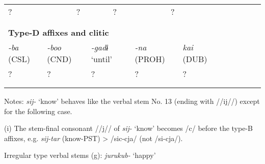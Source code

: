 \begin{tabularx}{\textwidth}{XXXXXXXXXXXXXXXXXXXXXX}
\multicolumn{4}{X}{{ ?}} & \multicolumn{3}{X}{?} & \multicolumn{5}{X}{?} & \multicolumn{4}{X}{{ ?}} & \multicolumn{6}{X}{}\\
\multicolumn{4}{X}{} & \multicolumn{3}{X}{} & \multicolumn{5}{X}{} & \multicolumn{4}{X}{} & \multicolumn{6}{X}{}\\
\multicolumn{22}{X}{}\\
\multicolumn{22}{X}{{\bfseries Type-D affixes and clitic}}\\
\multicolumn{2}{X}{{ \textit{{}-ba} (CSL)}} & \multicolumn{3}{X}{{ \textit{{}-boo} (CND)}} & \multicolumn{4}{X}{{ \textit{{}-gadɨ} ‘until’}} & \multicolumn{4}{X}{{ \textit{{}-na} (PROH)}} & \multicolumn{4}{X}{{ \textit{kai} (DUB)}} & \multicolumn{5}{X}{}\\
\multicolumn{2}{X}{?} & \multicolumn{3}{X}{{ ?}} & \multicolumn{4}{X}{{ ?}} & \multicolumn{4}{X}{{ ?}} & \multicolumn{4}{X}{{ ?}} & \multicolumn{5}{X}{}\\
\multicolumn{2}{X}{} & \multicolumn{3}{X}{} & \multicolumn{4}{X}{} & \multicolumn{4}{X}{} & \multicolumn{4}{X}{} & \multicolumn{5}{X}{}\\
\lspbottomrule
\end{tabularx}
Notes: \textit{sij-} ‘know’ behaves like the verbal stem No. 13 (ending with //ij//) except for the following case.

(i)  The stem-final consonant //j// of \textit{sij-} ‘know’ becomes /c/ before the type-B affixes, e.g. \textit{sij-tar} (know-PST) > /sic-cja/ (not /si-cja/).

Irregular type verbal stems (g): \textit{jurukub-} ‘happy’

\tablefirsthead{}

